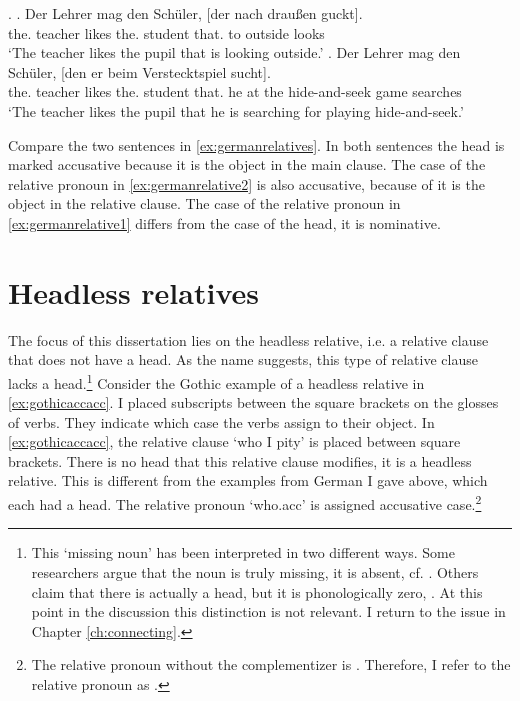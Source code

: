 \ex.\label{ex:germanrelatives}
\ag. Der Lehrer mag den Schüler, [der nach draußen guckt].\\
 the. teacher likes the. student that. to outside looks\\
 `The teacher likes the pupil that is looking outside.'\label{ex:germanrelative1}
 \bg. Der Lehrer mag den Schüler, [den er beim Verstecktspiel sucht].\\
 the. teacher likes the. student that. he {at the} {hide-and-seek game} searches\\
 `The teacher likes the pupil that he is searching for playing hide-and-seek.'\label{ex:germanrelative2}

Compare the two sentences in \ref{ex:germanrelatives}. In both sentences the head is marked accusative because it is the object in the main clause. The case of the relative pronoun in \ref{ex:germanrelative2} is also accusative, because of it is the object in the relative clause. The case of the relative pronoun in \ref{ex:germanrelative1} differs from the case of the head, it is nominative.


\section{Headless relatives}

The focus of this dissertation lies on the headless relative, i.e. a relative clause that does not have a head. As the name suggests, this type of relative clause lacks a head.\footnote{
This `missing noun' has been interpreted in two different ways. Some researchers argue that the noun is truly missing, it is absent, cf. \citealt{vanriemsdijk2006}. Others claim that there is actually a head, but it is phonologically zero, \citealt{himmelreich2017}. At this point in the discussion this distinction is not relevant. I return to the issue in Chapter \ref{ch:connecting}.
}
Consider the Gothic example of a headless relative in \ref{ex:gothicaccacc}. I placed subscripts between the square brackets on the glosses of verbs. They indicate which case the verbs assign to their object.
In \ref{ex:gothicaccacc}, the relative clause  `who I pity' is placed between square brackets. There is no head that this relative clause modifies, it is a headless relative. This is different from the examples from German I gave above, which each had a head.
The relative pronoun  `who.\ac{acc}' is assigned accusative case.\footnote{
The relative pronoun without the complementizer  is . Therefore, I refer to the relative pronoun as .
}

